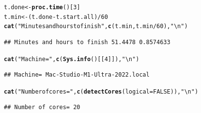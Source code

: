\documentclass[9pt]{article}\usepackage[]{graphicx}\usepackage[]{xcolor}
\makeatletter
\newcommand{\hlnum}[1]{\textcolor[rgb]{0.686,0.059,0.569}{#1}}%
\newcommand{\hlstr}[1]{\textcolor[rgb]{0.192,0.494,0.8}{#1}}%
\newcommand{\hlopt}[1]{\textcolor[rgb]{0,0,0}{#1}}%
\newcommand{\hlstd}[1]{\textcolor[rgb]{0.345,0.345,0.345}{#1}}%
\newcommand{\hlkwb}[1]{\textcolor[rgb]{0.69,0.353,0.396}{#1}}%
\newcommand{\hlkwc}[1]{\textcolor[rgb]{0.333,0.667,0.333}{#1}}%
\newcommand{\hlkwd}[1]{\textcolor[rgb]{0.737,0.353,0.396}{\textbf{#1}}}%
\newenvironment{kframe}{%
 \def\at@end@of@kframe{}%
 \ifinner\ifhmode%
  \def\at@end@of@kframe{\end{minipage}}%
  \begin{minipage}{\columnwidth}%
 \fi\fi%
 \def\FrameCommand##1{\hskip\@totalleftmargin \hskip-\fboxsep
 \colorbox{shadecolor}{##1}\hskip-\fboxsep
     \hskip-\linewidth \hskip-\@totalleftmargin \hskip\columnwidth}%
 \MakeFramed {\advance\hsize-\width
   \@totalleftmargin\z@ \linewidth\hsize
   \@setminipage}}%
 {\par\unskip\endMakeFramed%
 \at@end@of@kframe}
\newenvironment{knitrout}{}{} %
\theoremstyle{definition}
\theoremstyle{remark}
\makeatother
\begin{document}
\begin{knitrout}
\color{fgcolor}\begin{kframe}
\begin{alltt}
\hlstd{t.done} \hlkwb{<-} \hlkwd{proc.time}\hlstd{()[}\hlnum{3}\hlstd{]}
\hlstd{t.min} \hlkwb{<-} \hlstd{(t.done} \hlopt{-} \hlstd{t.start.all)}\hlopt{/}\hlnum{60}
\hlkwd{cat}\hlstd{(}\hlstr{"Minutes and hours to finish"}\hlstd{,} \hlkwd{c}\hlstd{(t.min, t.min}\hlopt{/}\hlnum{60}\hlstd{),} \hlstr{"\textbackslash{}n"}\hlstd{)}
\end{alltt}
\begin{verbatim}
## Minutes and hours to finish 51.4478 0.8574633
\end{verbatim}
\begin{alltt}
\hlkwd{cat}\hlstd{(}\hlstr{"Machine="}\hlstd{,} \hlkwd{c}\hlstd{(}\hlkwd{Sys.info}\hlstd{()[[}\hlnum{4}\hlstd{]]),} \hlstr{"\textbackslash{}n"}\hlstd{)}
\end{alltt}
\begin{verbatim}
## Machine= Mac-Studio-M1-Ultra-2022.local
\end{verbatim}
\begin{alltt}
\hlkwd{cat}\hlstd{(}\hlstr{"Number of cores="}\hlstd{,} \hlkwd{c}\hlstd{(}\hlkwd{detectCores}\hlstd{(}\hlkwc{logical} \hlstd{=} \hlnum{FALSE}\hlstd{)),} \hlstr{"\textbackslash{}n"}\hlstd{)}
\end{alltt}
\begin{verbatim}
## Number of cores= 20
\end{verbatim}
\end{kframe}
\end{knitrout}
\end{document}
